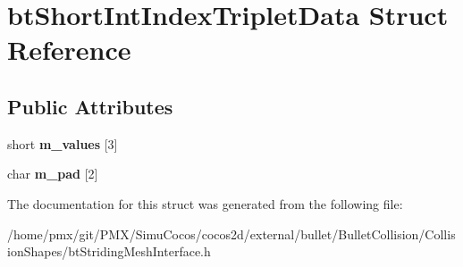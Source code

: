 \hypertarget{structbtShortIntIndexTripletData}{}\section{bt\+Short\+Int\+Index\+Triplet\+Data Struct Reference}
\label{structbtShortIntIndexTripletData}
\subsection*{Public Attributes}
\begin{DoxyCompactItemize}
\item 
\mbox{\label{structbtShortIntIndexTripletData_ae5535da81da050c94b46e204b7d87ff1}} 
short {\bfseries m\+\_\+values} \mbox{[}3\mbox{]}
\item 
\mbox{\label{structbtShortIntIndexTripletData_a135a9f31a92a9d02c2204941afccd5b1}} 
char {\bfseries m\+\_\+pad} \mbox{[}2\mbox{]}
\end{DoxyCompactItemize}


The documentation for this struct was generated from the following file\+:\begin{DoxyCompactItemize}
\item 
/home/pmx/git/\+P\+M\+X/\+Simu\+Cocos/cocos2d/external/bullet/\+Bullet\+Collision/\+Collision\+Shapes/bt\+Striding\+Mesh\+Interface.\+h\end{DoxyCompactItemize}
